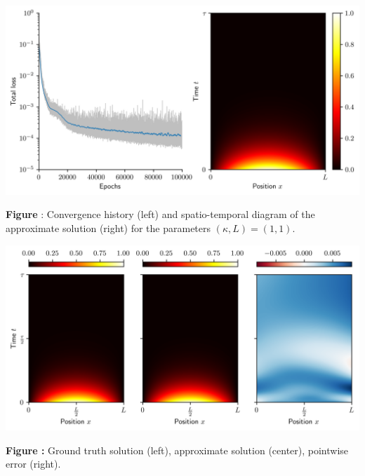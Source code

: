 \documentclass[aspectratio=169,compress,12pt,dvipsnames]{beamer}
\begin{document}
\begin{frame}
  \vfill
  \centering
  \includegraphics[width=.8\textwidth]{pinn_training.png}
  \par
  \small
  \textbf{Figure} : Convergence history (left) and spatio-temporal diagram of the approximate solution (right) for the parameters $(\kappa, L) = (1, 1)$.
  \vfill
\end{frame}

\begin{frame}
  \vfill
  \centering
  \includegraphics[width=.8\textwidth]{error.png}
  \par
  \small
  \textbf{Figure :} Ground truth solution (left), approximate solution (center), pointwise error (right).
  \vfill
\end{frame}
\end{document}
